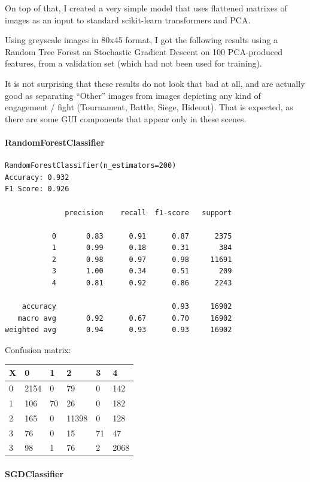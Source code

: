 \documentclass[
]{article}
\begin{document}
On top of that, I created a very simple model that uses flattened
matrixes of images as an input to standard scikit-learn
transformers and PCA.

Using greyscale images in 80x45 format, I got the following results
using a Random Tree Forest an Stochastic Gradient Descent on 100 PCA-produced features, from a
validation set (which had not been used for training).

It is not surprising that these results do not look that bad at all, and
are actually good as separating ``Other'' images from images depicting
any kind of engagement / fight (Tournament, Battle, Siege, Hideout).
That is expected, as there are some GUI components that appear only in
these scenes.

\hypertarget{randomforestclassifier}{%
\paragraph{RandomForestClassifier}\label{randomforestclassifier}}

\begin{verbatim}
RandomForestClassifier(n_estimators=200)
Accuracy: 0.932
F1 Score: 0.926

              precision    recall  f1-score   support

           0       0.83      0.91      0.87      2375
           1       0.99      0.18      0.31       384
           2       0.98      0.97      0.98     11691
           3       1.00      0.34      0.51       209
           4       0.81      0.92      0.86      2243

    accuracy                           0.93     16902
   macro avg       0.92      0.67      0.70     16902
weighted avg       0.94      0.93      0.93     16902
\end{verbatim}

Confusion matrix:

\begin{longtable}[]{@{}llllll@{}}
\toprule
X & 0 & 1 & 2 & 3 & 4\tabularnewline
\midrule
\endhead
0 & 2154 & 0 & 79 & 0 & 142\tabularnewline
1 & 106 & 70 & 26 & 0 & 182\tabularnewline
2 & 165 & 0 & 11398 & 0 & 128\tabularnewline
3 & 76 & 0 & 15 & 71 & 47\tabularnewline
3 & 98 & 1 & 76 & 2 & 2068\tabularnewline
\bottomrule
\end{longtable}

\hypertarget{sgdclassifier}{%
\paragraph{SGDClassifier}\label{sgdclassifier}}
\end{document}
